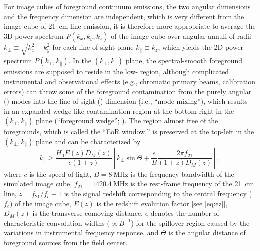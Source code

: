 \documentclass[modern]{aastex62}
\newcommand{\klos}{\text{$k_{\parallel}$}}
\newcommand{\kperp}{\text{$k_{\bot}$}}
\begin{document}
{\color{cyan}%
For image cubes of foreground continuum emissions, the two angular
dimensions and the frequency dimension are independent, which is very
different from the image cube of 21~cm line emission, it is therefore
more appropriate to average the 3D power spectrum $P(k_x, k_y, k_z)$}
of the image cube over angular annuli of radii
$\kperp \equiv \sqrt{k_x^2 + k_y^2}$ for each line-of-sight plane
$\klos \equiv k_z$, which yields the 2D power spectrum $P(\kperp, \klos)$.
In the $(\kperp, \klos)$ plane, the spectral-smooth foreground emissions
are supposed to reside in the low-\klos{} region, although complicated
instrumental and observational effects (e.g., chromatic primary beams,
calibration errors) can throw some of the foreground contamination from
the purely angular (\kperp) modes into the line-of-sight (\klos)
dimension (i.e., \enquote{mode mixing}), which results in an expanded
wedge-like contamination region at the bottom-right in the
$(\kperp, \klos)$ plane (\enquote{foreground wedge};
\citealt{datta2010,morales2012,liu2014}).
The region almost free of the foregrounds, which is called the
\enquote{EoR window,} is preserved at the top-left in the
$(\kperp, \klos)$ plane and can be characterized by
\citep{thyagarajan2013}
\begin{equation}
  \label{eq:eor-window}
  \klos \geq \frac{H_0 E(z) D_{\!M}(z)}{c (1+z)} \left[
    \kperp \sin\Theta +
    \frac{e}{B} \frac{2\pi f_{21}}{(1+z) D_{\!M}(z)} \right],
\end{equation}
where
$c$ is the speed of light,
$B = \SI{8}{\MHz}$ is the frequency bandwidth of the simulated image cube,
$f_{21} = \SI{1420.4}{\MHz}$ is the rest-frame frequency of the 21~cm line,
$z = f_{21}/f_c - 1$ is the signal redshift corresponding to the central
frequency ($f_c$) of the image cube,
$E(z)$ is the redshift evolution factor [see \autoref{eq:ez}],
$D_{\!M}(z)$ is the transverse comoving distance,
$e$ denotes the number of characteristic convolution widths
($\propto B^{-1}$) for the spillover region caused by the variations in
instrumental frequency response,
and $\Theta$ is the angular distance of foreground sources from the
field center.
\end{document}

